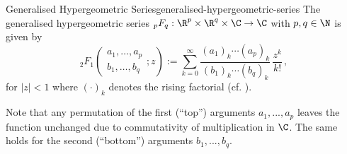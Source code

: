 \begin{definition}{Generalised Hypergeometric Series}{generalised-hypergeometric-series}
  The generalised hypergeometric series ${}_pF_q: \R^p \times \R^q \times \C \to \C$ with $p, q \in \N$ is given by
  $${}_2F_1\left(\begin{matrix}a_{1}, \ldots, a_{p} \\b_{1}, \ldots, b_{q}\end{matrix}; z\right) := \sum _{k=0}^{\infty }{\frac {(a_{1})_{k}\cdots (a_{p})_{k}}{(b_{1})_{k}\cdots (b_{q})_{k}}}\,{\frac {z^{k}}{k!}}\,,$$
  for $|z| < 1$ where $(\cdot)_k$ denotes the rising factorial (cf. ).
\end{definition}

Note that any permutation of the first (``top'') arguments $a_1, ..., a_p$ leaves the function unchanged due to commutativity of multiplication in $\C$. The same holds for the second (``bottom'') arguments $b_1, ..., b_q$.
